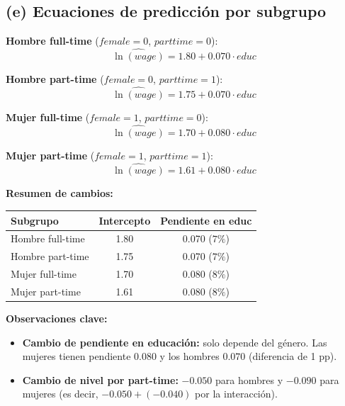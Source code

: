 \documentclass[11pt,a4paper]{article}
\begin{document}
\subsection*{(e) Ecuaciones de predicción por subgrupo}

\textbf{Hombre full-time} (\(female=0\), \(parttime=0\)):
\[
\widehat{\ln(wage)} = 1.80 + 0.070 \cdot educ
\]

\textbf{Hombre part-time} (\(female=0\), \(parttime=1\)):
\[
\widehat{\ln(wage)} = 1.75 + 0.070 \cdot educ
\]

\textbf{Mujer full-time} (\(female=1\), \(parttime=0\)):
\[
\widehat{\ln(wage)} = 1.70 + 0.080 \cdot educ
\]

\textbf{Mujer part-time} (\(female=1\), \(parttime=1\)):
\[
\widehat{\ln(wage)} = 1.61 + 0.080 \cdot educ
\]

\vspace{0.3cm}

\textbf{Resumen de cambios:}

\begin{center}
\begin{tabular}{lcc}
\toprule
\textbf{Subgrupo} & \textbf{Intercepto} & \textbf{Pendiente en educ} \\
\midrule
Hombre full-time & 1.80 & 0.070 (\(7\%\)) \\
Hombre part-time & 1.75 & 0.070 (\(7\%\)) \\
Mujer full-time  & 1.70 & 0.080 (\(8\%\)) \\
Mujer part-time  & 1.61 & 0.080 (\(8\%\)) \\
\bottomrule
\end{tabular}
\end{center}

\textbf{Observaciones clave:}
\begin{itemize}[leftmargin=2em]
    \item \textbf{Cambio de pendiente en educación:} solo depende del género. Las mujeres tienen pendiente \(0.080\) y los hombres \(0.070\) (diferencia de 1 pp).
    \item \textbf{Cambio de nivel por part-time:} \(-0.050\) para hombres y \(-0.090\) para mujeres (es decir, \(-0.050 + (-0.040)\) por la interacción).
\end{itemize}
\end{document}
